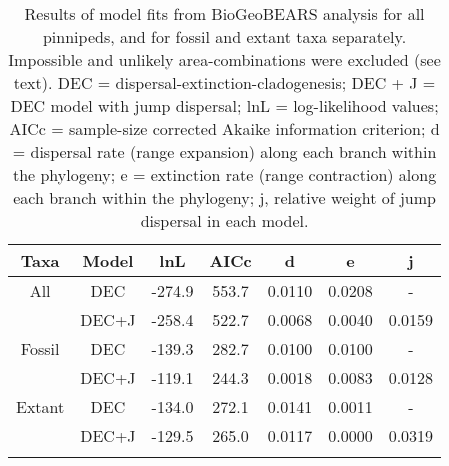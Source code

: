\begin{longtable}{ccccccc}

\caption{Results of model fits from BioGeoBEARS analysis for all pinnipeds, and for fossil and extant taxa separately. Impossible and unlikely area-combinations were excluded (see text). DEC = dispersal-extinction-cladogenesis; DEC + J = DEC model with jump dispersal; lnL = log-likelihood values; AICc = sample-size corrected Akaike information criterion; d = dispersal rate (range expansion) along each branch within the phylogeny; e = extinction rate (range contraction) along each branch within the phylogeny; j, relative weight of jump dispersal in each model.
}\\

\hline
\textbf{Taxa} & 
\textbf{Model} & 
\textbf{lnL} &
\textbf{AICc} &
\textbf{d}&
\textbf{e} &
\textbf{j}\\
\hline
All &
DEC &
-274.9 &
553.7 &
0.0110 &
0.0208 &
-\\

 &
DEC+J &
-258.4 &
522.7 &
0.0068 &
0.0040 &
0.0159 \\

Fossil &
DEC &
-139.3 &
282.7 &
0.0100 &
0.0100 &
-\\

 &
DEC+J &
-119.1 &
244.3 &
0.0018 &
0.0083 &
0.0128 \\

Extant &
DEC &
-134.0 &
272.1 &
0.0141 &
0.0011 &
-\\

 &
DEC+J &
-129.5 &
265.0 &
0.0117 &
0.0000 &
0.0319\\

\hline

\label{table-biogeo-results}
\end{longtable}